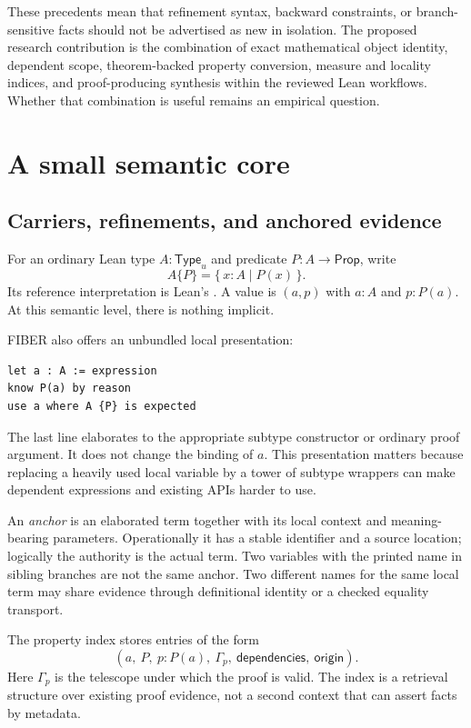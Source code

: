 \documentclass[11pt,letterpaper]{article}
\theoremstyle{definition}\newtheorem{definition}[theorem]{Definition}
\newcommand{\Type}{\mathsf{Type}}\newcommand{\Prop}{\mathsf{Prop}}
\newcommand{\Rfn}[2]{\{\, #1\mid #2\,\}}
\newcommand{\code}[1]{\texttt{\detokenize{#1}}}
\begin{document}
These precedents mean that refinement syntax, backward constraints, or branch-sensitive facts should not be advertised as new in isolation. The proposed research contribution is the combination of exact mathematical object identity, dependent scope, theorem-backed property conversion, measure and locality indices, and proof-producing synthesis within the reviewed Lean workflows. Whether that combination is useful remains an empirical question.

\section{A small semantic core}\label{sec:core}
\subsection{Carriers, refinements, and anchored evidence}
For an ordinary Lean type $A:\Type_u$ and predicate $P:A\to\Prop$, write
\[
 A\{P\}=\Rfn{x:A}{P(x)}.
\]
Its reference interpretation is Lean's \code{Subtype P}. A value is $(a,p)$ with $a:A$ and $p:P(a)$. At this semantic level, there is nothing implicit.

FIBER also offers an unbundled local presentation:
\begin{lstlisting}
let a : A := expression
know P(a) by reason
use a where A {P} is expected
\end{lstlisting}
The last line elaborates to the appropriate subtype constructor or ordinary proof argument. It does not change the binding of $a$. This presentation matters because replacing a heavily used local variable by a tower of subtype wrappers can make dependent expressions and existing APIs harder to use.

An \emph{anchor} is an elaborated term together with its local context and meaning-bearing parameters. Operationally it has a stable identifier and a source location; logically the authority is the actual term. Two variables with the printed name \code{x} in sibling branches are not the same anchor. Two different names for the same local term may share evidence through definitional identity or a checked equality transport.

The property index stores entries of the form
\[
 (a,\ P,\ p:P(a),\ \Gamma_p,\ \mathsf{dependencies},\ \mathsf{origin}).
\]
Here $\Gamma_p$ is the telescope under which the proof is valid. The index is a retrieval structure over existing proof evidence, not a second context that can assert facts by metadata.
\end{document}

